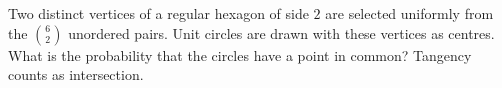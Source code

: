 Two distinct vertices of a regular hexagon of side $2$ are selected uniformly from the $\binom62$ unordered pairs. Unit circles are drawn with these vertices as centres. What is the probability that the circles have a point in common? Tangency counts as intersection.
